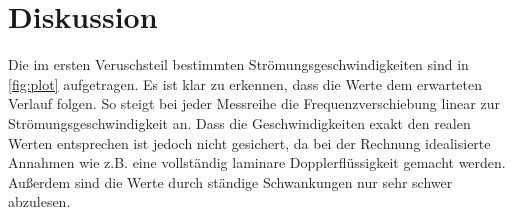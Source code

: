 \section{Diskussion}
\label{sec:Diskussion}
Die im ersten Veruschsteil bestimmten Strömungsgeschwindigkeiten sind in \autoref{fig:plot} aufgetragen.
Es ist klar zu erkennen, dass die Werte dem erwarteten Verlauf folgen.
So steigt bei jeder Messreihe die Frequenzverschiebung linear zur Strömungsgeschwindigkeit an.
Dass die Geschwindigkeiten exakt den realen Werten entsprechen ist jedoch nicht
gesichert, da bei der Rechnung idealisierte Annahmen wie z.B. eine vollständig laminare
Dopplerflüssigkeit gemacht werden. Außerdem sind die Werte durch ständige Schwankungen nur sehr schwer abzulesen.


